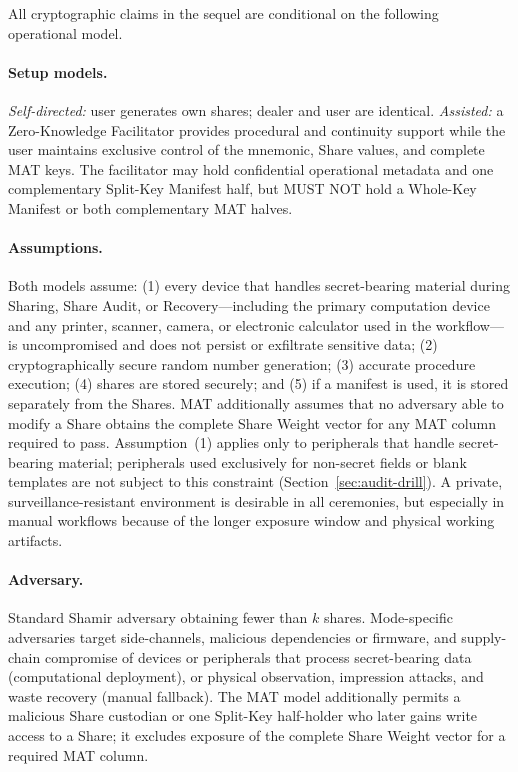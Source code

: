 \documentclass[11pt]{article}
\begin{document}
All cryptographic claims in the sequel are conditional on the following operational model.

\paragraph{Setup models.} \emph{Self-directed:} user generates own shares; dealer and user are identical. \emph{Assisted:} a Zero-Knowledge Facilitator provides procedural and continuity support while the user maintains exclusive control of the mnemonic, Share values, and complete MAT keys. The facilitator may hold confidential operational metadata and one complementary Split-Key Manifest half, but MUST NOT hold a Whole-Key Manifest or both complementary MAT halves.

\paragraph{Assumptions.} Both models assume: (1) every device that handles secret-bearing material during Sharing, Share Audit, or Recovery---including the primary computation device and any printer, scanner, camera, or electronic calculator used in the workflow---is uncompromised and does not persist or exfiltrate sensitive data; (2) cryptographically secure random number generation; (3) accurate procedure execution; (4) shares are stored securely; and (5) if a manifest is used, it is stored separately from the Shares. MAT additionally assumes that no adversary able to modify a Share obtains the complete Share Weight vector for any MAT column required to pass. Assumption~(1) applies only to peripherals that handle secret-bearing material; peripherals used exclusively for non-secret fields or blank templates are not subject to this constraint (Section~\ref{sec:audit-drill}). A private, surveillance-resistant environment is desirable in all ceremonies, but especially in manual workflows because of the longer exposure window and physical working artifacts.

\paragraph{Adversary.} Standard Shamir adversary obtaining fewer than $k$ shares. Mode-specific adversaries target side-channels, malicious dependencies or firmware, and supply-chain compromise of devices or peripherals that process secret-bearing data (computational deployment), or physical observation, impression attacks, and waste recovery (manual fallback). The MAT model additionally permits a malicious Share custodian or one Split-Key half-holder who later gains write access to a Share; it excludes exposure of the complete Share Weight vector for a required MAT column.
\end{document}
